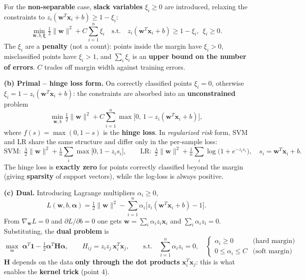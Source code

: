 For the \textbf{non-separable} case, \textbf{slack variables} $\xi_i\ge0$ are introduced, relaxing the constraints to $z_i(\mathbf{w}^T\mathbf{x}_i+b)\ge1-\xi_i$:
\[
\min_{\mathbf{w},b,\boldsymbol\xi}\tfrac12\|\mathbf{w}\|^2+C\sum_{i=1}^n\xi_i\quad\text{s.t.}\quad z_i(\mathbf{w}^T\mathbf{x}_i+b)\ge1-\xi_i,\ \ \xi_i\ge0 .
\]
The $\xi_i$ are a \textbf{penalty} (not a count): points inside the margin have $\xi_i>0$, misclassified points have $\xi_i>1$, and $\sum_i\xi_i$ is an \textbf{upper bound on the number of errors}. $C$ trades off margin width against training errors.

\textbf{(b) Primal -- hinge loss form.} On correctly classified points $\xi_i=0$, otherwise $\xi_i=1-z_i(\mathbf{w}^T\mathbf{x}_i+b)$: the constraints are absorbed into an \textbf{unconstrained} problem
\[
\min_{\mathbf{w},b}\tfrac12\|\mathbf{w}\|^2+C\sum_{i=1}^n\max\!\big[0,\,1-z_i(\mathbf{w}^T\mathbf{x}_i+b)\big],
\]
where $f(s)=\max(0,1-s)$ is the \textbf{hinge loss}. In \emph{regularized risk} form, SVM and LR share the same structure and differ only in the per-sample loss:
\[
\text{SVM:}\ \ \tfrac{\lambda}{2}\|\mathbf{w}\|^2+\tfrac1n\sum_i\max\!\big[0,1-z_is_i\big],\qquad
\text{LR:}\ \ \tfrac{\lambda}{2}\|\mathbf{w}\|^2+\tfrac1n\sum_i\log\!\big(1+e^{-z_is_i}\big),\quad s_i=\mathbf{w}^T\mathbf{x}_i+b.
\]
The hinge loss is \textbf{exactly zero} for points correctly classified beyond the margin (giving \textbf{sparsity} of support vectors), while the log-loss is always positive.

\textbf{(c) Dual.} Introducing Lagrange multipliers $\alpha_i\ge0$,
\[
L(\mathbf{w},b,\boldsymbol\alpha)=\tfrac12\|\mathbf{w}\|^2-\sum_{i=1}^n\alpha_i\big[z_i(\mathbf{w}^T\mathbf{x}_i+b)-1\big].
\]
From $\nabla_{\mathbf{w}}L=0$ and $\partial L/\partial b=0$ one gets $\mathbf{w}=\sum_i\alpha_iz_i\mathbf{x}_i$ and $\sum_i\alpha_iz_i=0$. Substituting, the \textbf{dual problem} is
\[
\max_{\boldsymbol\alpha}\;\boldsymbol\alpha^T\mathbf{1}-\tfrac12\boldsymbol\alpha^T\mathbf{H}\boldsymbol\alpha,\qquad H_{ij}=z_iz_j\,\mathbf{x}_i^T\mathbf{x}_j,\qquad
\text{s.t.}\quad \sum_{i=1}^n\alpha_iz_i=0,\quad
\begin{cases}\alpha_i\ge0 & \text{(hard margin)}\\0\le\alpha_i\le C & \text{(soft margin)}\end{cases}
\]
$\mathbf{H}$ depends on the data \textbf{only through the dot products} $\mathbf{x}_i^T\mathbf{x}_j$: this is what enables the \textbf{kernel trick} (point 4).

